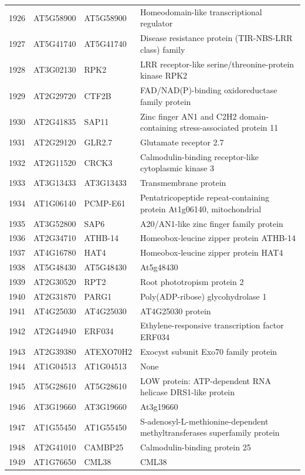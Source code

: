 \documentclass[11pt]{article}
\begin{document}
\begin{center}
\begin{tabular}{rlll}
1926 & AT5G58900 & AT5G58900 & Homeodomain-like transcriptional regulator\\
1927 & AT5G41740 & AT5G41740 & Disease resistance protein (TIR-NBS-LRR class) family\\
1928 & AT3G02130 & RPK2 & LRR receptor-like serine/threonine-protein kinase RPK2\\
1929 & AT2G29720 & CTF2B & FAD/NAD(P)-binding oxidoreductase family protein\\
1930 & AT2G41835 & SAP11 & Zinc finger AN1 and C2H2 domain-containing stress-associated protein 11\\
1931 & AT2G29120 & GLR2.7 & Glutamate receptor 2.7\\
1932 & AT2G11520 & CRCK3 & Calmodulin-binding receptor-like cytoplasmic kinase 3\\
1933 & AT3G13433 & AT3G13433 & Transmembrane protein\\
1934 & AT1G06140 & PCMP-E61 & Pentatricopeptide repeat-containing protein At1g06140, mitochondrial\\
1935 & AT3G52800 & SAP6 & A20/AN1-like zinc finger family protein\\
1936 & AT2G34710 & ATHB-14 & Homeobox-leucine zipper protein ATHB-14\\
1937 & AT4G16780 & HAT4 & Homeobox-leucine zipper protein HAT4\\
1938 & AT5G48430 & AT5G48430 & At5g48430\\
1939 & AT2G30520 & RPT2 & Root phototropism protein 2\\
1940 & AT2G31870 & PARG1 & Poly(ADP-ribose) glycohydrolase 1\\
1941 & AT4G25030 & AT4G25030 & AT4G25030 protein\\
1942 & AT2G44940 & ERF034 & Ethylene-responsive transcription factor ERF034\\
1943 & AT2G39380 & ATEXO70H2 & Exocyst subunit Exo70 family protein\\
1944 & AT1G04513 & AT1G04513 & None\\
1945 & AT5G28610 & AT5G28610 & LOW protein: ATP-dependent RNA helicase DRS1-like protein\\
1946 & AT3G19660 & AT3G19660 & At3g19660\\
1947 & AT1G55450 & AT1G55450 & S-adenosyl-L-methionine-dependent methyltransferases superfamily protein\\
1948 & AT2G41010 & CAMBP25 & Calmodulin-binding protein 25\\
1949 & AT1G76650 & CML38 & CML38\\

\end{tabular}
\end{center}
\end{document}
